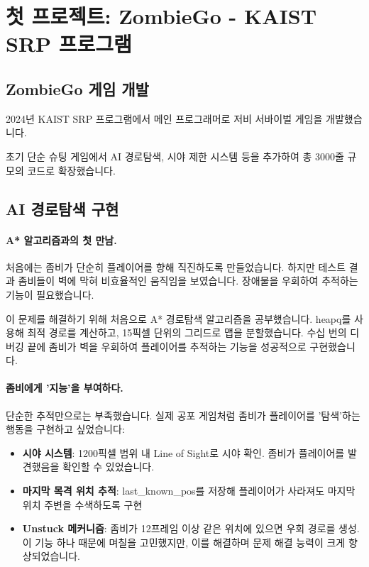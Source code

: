 \section{첫 프로젝트: ZombieGo - KAIST SRP 프로그램}

\subsection{ZombieGo 게임 개발}
2024년 KAIST SRP 프로그램에서 메인 프로그래머로 저비 서바이벌 게임을 개발했습니다.

초기 단순 슈팅 게임에서 AI 경로탐색, 시야 제한 시스템 등을 추가하여 총 3000줄 규모의 코드로 확장했습니다.

\subsection{AI 경로탐색 구현}

\paragraph{A* 알고리즘과의 첫 만남.} 
처음에는 좀비가 단순히 플레이어를 향해 직진하도록 만들었습니다. 하지만 테스트 결과 좀비들이 벽에 막혀 비효율적인 움직임을 보였습니다. 장애물을 우회하여 추적하는 기능이 필요했습니다. 

이 문제를 해결하기 위해 처음으로 A* 경로탐색 알고리즘을 공부했습니다. heapq를 사용해 최적 경로를 계산하고, 15픽셀 단위의 그리드로 맵을 분할했습니다. 수십 번의 디버깅 끝에 좀비가 벽을 우회하여 플레이어를 추적하는 기능을 성공적으로 구현했습니다.

\paragraph{좀비에게 '지능'을 부여하다.}
단순한 추적만으로는 부족했습니다. 실제 공포 게임처럼 좀비가 플레이어를 '탐색'하는 행동을 구현하고 싶었습니다:

\begin{itemize}[leftmargin=*]
    \item \textbf{시야 시스템}: 1200픽셀 범위 내 Line of Sight로 시야 확인. 좀비가 플레이어를 발견했음을 확인할 수 있었습니다.
    \item \textbf{마지막 목격 위치 추적}: last\_known\_pos를 저장해 플레이어가 사라져도 마지막 위치 주변을 수색하도록 구현
    \item \textbf{Unstuck 메커니즘}: 좀비가 12프레임 이상 같은 위치에 있으면 우회 경로를 생성. 이 기능 하나 때문에 며칠을 고민했지만, 이를 해결하며 문제 해결 능력이 크게 향상되었습니다.
\end{itemize}

